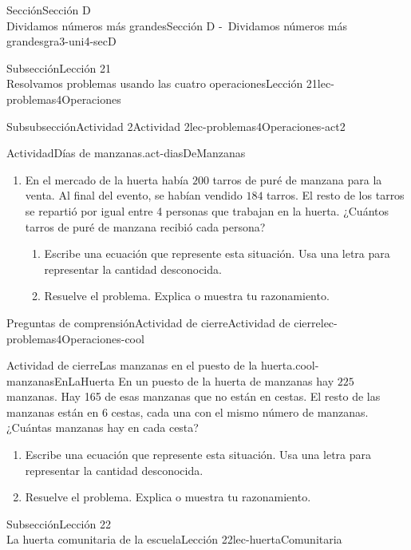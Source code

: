 \begin{sectionptx}{Sección}{{\Large Sección D\\}Dividamos números más grandes}{}{Sección D -~Dividamos números más grandes}{}{}{gra3-uni4-secD}
\begin{subsectionptx}{Subsección}{{\normalsize Lección 21\\[-0.05cm]}Resolvamos problemas usando las cuatro operaciones}{}{Lección 21}{}{}{lec-problemas4Operaciones}
\begin{subsubsectionptx}{Subsubsección}{Actividad 2}{}{Actividad 2}{}{}{lec-problemas4Operaciones-act2}
\begin{activity}{Actividad}{Días de manzanas.}{act-diasDeManzanas}
\begin{enumerate}
\item{}En el mercado de la huerta había \(200\) tarros de puré de manzana para la venta. Al final del evento, se habían vendido \(184\) tarros. El resto de los tarros se repartió por igual entre 4 personas que trabajan en la huerta. ¿Cuántos tarros de puré de manzana recibió cada persona?%
%
\begin{enumerate}
\item{}Escribe una ecuación que represente esta situación. Usa una letra para representar la cantidad desconocida.%
\item{}Resuelve el problema. Explica o muestra tu razonamiento.%
\end{enumerate}
\end{enumerate}
\end{activity}%
\end{subsubsectionptx}
%
%
\typeout{************************************************}
\typeout{************************************************}
%
\begin{reading-questions-subsubsection}{Preguntas de comprensión}{Actividad de cierre}{}{Actividad de cierre}{}{}{lec-problemas4Operaciones-cool}
\begin{project}{Actividad de cierre}{Las manzanas en el puesto de la huerta.}{cool-manzanasEnLaHuerta}%
En un puesto de la huerta de manzanas hay \(225\) manzanas. Hay 165 de esas manzanas que no están en cestas. El resto de las manzanas están en \(6\) cestas, cada una con el mismo número de manzanas. ¿Cuántas manzanas hay en cada cesta?%
%
\begin{enumerate}[label={(\alph*)}]
\item{}Escribe una ecuación que represente esta situación. Usa una letra para representar la cantidad desconocida.%
\item{}Resuelve el problema. Explica o muestra tu razonamiento.%
\end{enumerate}
\end{project}%
\end{reading-questions-subsubsection}
\end{subsectionptx}
%
%
\typeout{************************************************}
\typeout{************************************************}
%
\begin{subsectionptx}{Subsección}{{\normalsize Lección 22\\[-0.05cm]}La huerta comunitaria de la escuela}{}{Lección 22}{}{}{lec-huertaComunitaria}

\end{subsectionptx}
\end{sectionptx}
